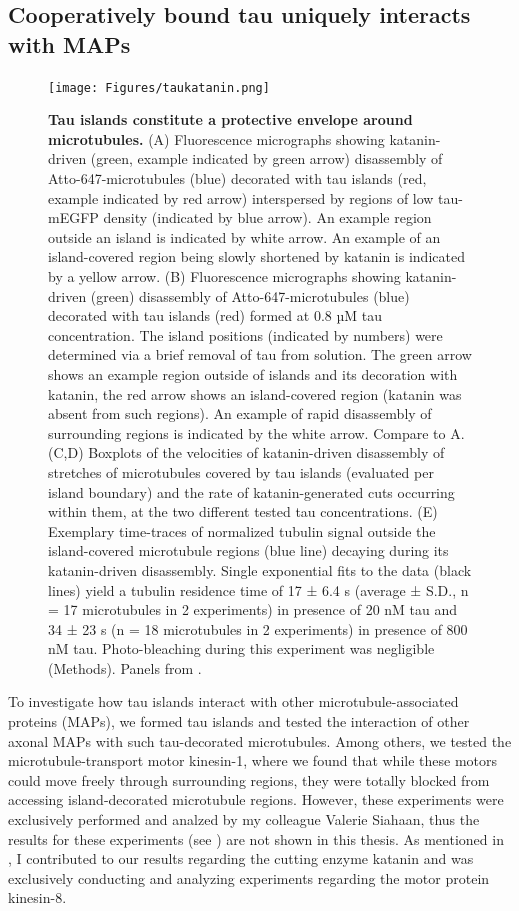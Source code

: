 \FloatBarrier
\subsection{Cooperatively bound tau uniquely interacts with MAPs}
\begin{figure}[h!]
\centering
\texttt{[image: Figures/taukatanin.png]}
\caption[Tau islands constitute a protective envelope around microtubules.]{
\textbf{Tau islands constitute a protective envelope around microtubules.} (A) Fluorescence micrographs showing katanin-driven (green, example indicated by green arrow) disassembly of Atto-647-microtubules (blue) decorated with tau islands (red, example indicated by red arrow) interspersed by regions of low tau-mEGFP density (indicated by blue arrow). An example region outside an island is indicated by white arrow. An example of an island-covered region being slowly shortened by katanin is indicated by a yellow arrow. (B) Fluorescence micrographs showing katanin-driven (green) disassembly of Atto-647-microtubules (blue) decorated with tau islands (red) formed at 0.8 µM tau concentration. The island positions (indicated by numbers) were determined via a brief removal of tau from solution. The green arrow shows an example region outside of islands and its decoration with katanin, the red arrow shows an island-covered region (katanin was absent from such regions). An example of rapid disassembly of surrounding regions is indicated by the white arrow. Compare to A. (C,D) Boxplots of the velocities of katanin-driven disassembly of stretches of microtubules covered by tau islands (evaluated per island boundary) and the rate of katanin-generated cuts occurring within them, at the two different tested tau concentrations. (E) Exemplary time-traces of normalized tubulin signal outside the island-covered microtubule regions (blue line) decaying during its katanin-driven disassembly. Single exponential fits to the data (black lines) yield a tubulin residence time of 17 ± 6.4 s (average ± S.D., n = 17 microtubules in 2 experiments) in presence of 20 nM tau and 34 ± 23 s (n = 18 microtubules in 2 experiments) in presence of 800 nM tau. Photo-bleaching during this experiment was negligible (Methods). Panels from \cite{Siahaan2019a}.
	}\label{taukatanin}
\end{figure}
To investigate how tau islands interact with other microtubule-associated proteins (MAPs), we formed tau islands and tested the interaction of other axonal MAPs with such tau-decorated microtubules. Among others, we tested the microtubule-transport motor kinesin-1, where we found that while these motors could move freely through surrounding regions, they were totally blocked from accessing island-decorated microtubule regions. However, these experiments were exclusively performed and analzed by my colleague Valerie Siahaan, thus the results for these experiments (see \cite{Siahaan2019a}) are not shown in this thesis. As mentioned in , I contributed to our results regarding the cutting enzyme katanin and was exclusively conducting and analyzing experiments regarding the motor protein kinesin-8.\par

